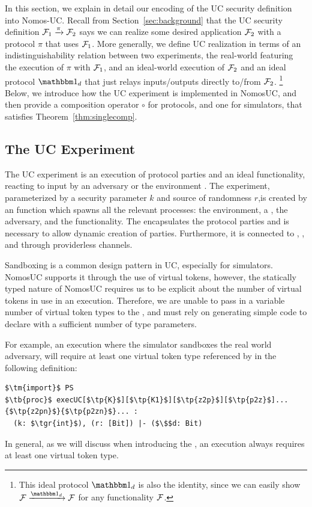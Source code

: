 In this section, we explain in detail our encoding of the UC security definition into Nomos-UC.
Recall from Section~\ref{sec:background} that the UC security definition $\mathcal{F}_1 \xrightarrow{\pi} \mathcal{F}_2$ says we can realize some desired application $\mathcal{F}_2$ with a protocol $\pi$ that uses $\mathcal{F}_1$.
More generally, we define UC realization in terms of an indistinguishability relation between two experiments, the real-world featuring the execution of $\pi$ with $\mathcal{F}_1$, and an ideal-world execution of $\mathcal{F}_2$ and an ideal protocol $\idealP$ that just relays inputs/outputs directly to/from $\mathcal{F}_2$.%
\footnote{This ideal protocol $\idealP$ is also the identity, since we can easily show $\F \xrightarrow{\idealP} \F$ for any functionality $\mathcal{F}$.}
Below, we introduce how the UC experiment is implemented in NomosUC, and then provide a composition operator $\circ$ for protocols, and one for simulators, that satisfies Theorem~\ref{thm:singlecomp}.

\subsection{The UC Experiment}
The UC experiment is an execution of protocol parties and an ideal functionality, reacting to input by an adversary \A or the environment \Z.
The experiment, parameterized by a security parameter $k$ and source of randomness $r$,is created by an  function  which spawns all the relevant processes: the environment, a \partywrapper, the adversary, and the functionality.
The \partywrapper encapsulates the protocol parties and is necessary to allow dynamic creation of parties. 
Furthermore, it is connected to \Z, \A, and \F through providerless channels.

Sandboxing is a common design pattern in UC, especially for simulators.
NomosUC supports it through the use of virtual tokens, however, the statically typed nature of NomosUC requires us to be explicit about the number of virtual tokens in use in an execution.
Therefore, we are unable to pass in a variable number of virtual token types to the , and must rely on generating simple code  to declare  with a sufficient number of type parameters.

For example, an execution where the simulator sandboxes the real world adversary,  will require at least one virtual token type referenced by  in the following definition:
\begin{lstlisting}[basicstyle=\scriptsize\BeraMonottFamily, frame=single, mathescape, caption={The process definition of the \msf{execUC} function.}]
$\tm{import}$ PS 
$\tb{proc}$ execUC[$\tp{K}$][$\tp{K1}$][$\tp{z2p}$][$\tp{p2z}$]...{$\tp{z2pn}$}{$\tp{p2zn}$}... :
  (k: $\tgr{int}$), (r: [Bit]) |- ($\$$d: Bit)
\end{lstlisting}
In general, as we will discuss when introducing the \partywrapper, an execution always requires at least one virtual token type.


